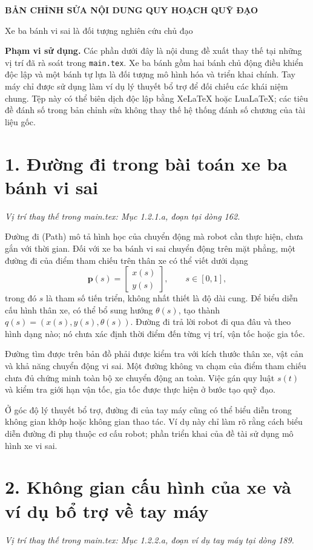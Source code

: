 \documentclass[12pt,a4paper,oneside]{report}
\newcommand{\vitri}[1]{\par\noindent\textit{Vị trí thay thế trong main.tex: #1.}\par}
\begin{document}
\begin{center}
  {\Large\bfseries BẢN CHỈNH SỬA NỘI DUNG QUY HOẠCH QUỸ ĐẠO}\par
  \medskip
  {\large Xe ba bánh vi sai là đối tượng nghiên cứu chủ đạo}
\end{center}

\noindent\textbf{Phạm vi sử dụng.} Các phần dưới đây là nội dung đề xuất thay thế tại những vị trí đã rà soát trong \texttt{main.tex}. Xe ba bánh gồm hai bánh chủ động điều khiển độc lập và một bánh tự lựa là đối tượng mô hình hóa và triển khai chính. Tay máy chỉ được sử dụng làm ví dụ lý thuyết bổ trợ để đối chiếu các khái niệm chung. Tệp này có thể biên dịch độc lập bằng XeLaTeX hoặc LuaLaTeX; các tiêu đề đánh số trong bản chỉnh sửa không thay thế hệ thống đánh số chương của tài liệu gốc.

\section*{1. Đường đi trong bài toán xe ba bánh vi sai}
\vitri{Mục 1.2.1.a, đoạn tại dòng 162}

Đường đi (Path) mô tả hình học của chuyển động mà robot cần thực hiện, chưa gắn với thời gian. Đối với xe ba bánh vi sai chuyển động trên mặt phẳng, một đường đi của điểm tham chiếu trên thân xe có thể viết dưới dạng
\[
  \mathbf p(s)=\begin{bmatrix}x(s)\\y(s)\end{bmatrix},\qquad s\in[0,1],
\]
trong đó \(s\) là tham số tiến triển, không nhất thiết là độ dài cung. Để biểu diễn cấu hình thân xe, có thể bổ sung hướng \(\theta(s)\), tạo thành \(q(s)=(x(s),y(s),\theta(s))\). Đường đi trả lời robot đi qua đâu và theo hình dạng nào; nó chưa xác định thời điểm đến từng vị trí, vận tốc hoặc gia tốc.

Đường tìm được trên bản đồ phải được kiểm tra với kích thước thân xe, vật cản và khả năng chuyển động vi sai. Một đường không va chạm của điểm tham chiếu chưa đủ chứng minh toàn bộ xe chuyển động an toàn. Việc gán quy luật \(s(t)\) và kiểm tra giới hạn vận tốc, gia tốc được thực hiện ở bước tạo quỹ đạo.

Ở góc độ lý thuyết bổ trợ, đường đi của tay máy cũng có thể biểu diễn trong không gian khớp hoặc không gian thao tác. Ví dụ này chỉ làm rõ rằng cách biểu diễn đường đi phụ thuộc cơ cấu robot; phần triển khai của đề tài sử dụng mô hình xe vi sai.

\section*{2. Không gian cấu hình của xe và ví dụ bổ trợ về tay máy}
\vitri{Mục 1.2.2.a, đoạn ví dụ tay máy tại dòng 189}
\end{document}
